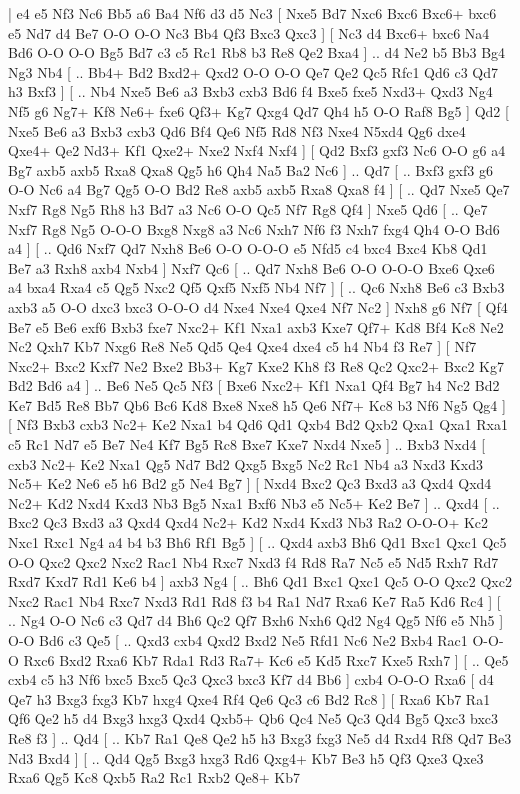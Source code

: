 \makegametitle 
|   e4   e5    Nf3   Nc6    Bb5   a6    Ba4   Nf6    d3   d5    Nc3 [  Nxe5 Bd7  Nxc6 Bxc6  Bxc6+ bxc6  e5 Nd7  d4 Be7  O-O O-O  Nc3 Bb4  Qf3 Bxc3  Qxc3   ]  [  Nc3 d4  Bxc6+ bxc6  Na4 Bd6  O-O O-O  Bg5 Bd7  c3 c5  Rc1 Rb8  b3 Re8  Qe2 Bxa4   ] .. d4    Ne2   b5    Bb3   Bg4    Ng3   Nb4 [ .. Bb4+  Bd2 Bxd2+  Qxd2 O-O  O-O Qe7  Qe2 Qc5  Rfc1 Qd6  c3 Qd7  h3 Bxf3   ]  [ .. Nb4  Nxe5 Be6  a3 Bxb3  cxb3 Bd6  f4 Bxe5  fxe5 Nxd3+  Qxd3 Ng4  Nf5 g6  Ng7+ Kf8  Ne6+ fxe6  Qf3+ Kg7  Qxg4 Qd7  Qh4 h5  O-O Raf8  Bg5   ]  Qd2 [  Nxe5 Be6  a3 Bxb3  cxb3 Qd6  Bf4 Qe6  Nf5 Rd8  Nf3 Nxe4  N5xd4 Qg6  dxe4 Qxe4+  Qe2 Nd3+  Kf1 Qxe2+  Nxe2 Nxf4  Nxf4   ]  [  Qd2 Bxf3  gxf3 Nc6  O-O g6  a4 Bg7  axb5 axb5  Rxa8 Qxa8  Qg5 h6  Qh4 Na5  Ba2 Nc6   ] .. Qd7 [ .. Bxf3  gxf3 g6  O-O Nc6  a4 Bg7  Qg5 O-O  Bd2 Re8  axb5 axb5  Rxa8 Qxa8  f4   ]  [ .. Qd7  Nxe5 Qe7  Nxf7 Rg8  Ng5 Rh8  h3 Bd7  a3 Nc6  O-O Qc5  Nf7 Rg8  Qf4   ]  Nxe5   Qd6 [ .. Qe7  Nxf7 Rg8  Ng5 O-O-O  Bxg8 Nxg8  a3 Nc6  Nxh7 Nf6  f3 Nxh7  fxg4 Qh4  O-O Bd6  a4   ]  [ .. Qd6  Nxf7 Qd7  Nxh8 Be6  O-O O-O-O  e5 Nfd5  c4 bxc4  Bxc4 Kb8  Qd1 Be7  a3 Rxh8  axb4 Nxb4   ]  Nxf7   Qc6 [ .. Qd7  Nxh8 Be6  O-O O-O-O  Bxe6 Qxe6  a4 bxa4  Rxa4 c5  Qg5 Nxc2  Qf5 Qxf5  Nxf5 Nb4  Nf7   ]  [ .. Qc6  Nxh8 Be6  c3 Bxb3  axb3 a5  O-O dxc3  bxc3 O-O-O  d4 Nxe4  Nxe4 Qxe4  Nf7 Nc2   ]  Nxh8   g6    Nf7 [  Qf4 Be7  e5 Be6  exf6 Bxb3  fxe7 Nxc2+  Kf1 Nxa1  axb3 Kxe7  Qf7+ Kd8  Bf4 Kc8  Ne2 Nc2  Qxh7 Kb7  Nxg6 Re8  Ne5 Qd5  Qe4 Qxe4  dxe4 c5  h4 Nb4  f3 Re7   ]  [  Nf7 Nxc2+  Bxc2 Kxf7  Ne2 Bxe2  Bb3+ Kg7  Kxe2 Kh8  f3 Re8  Qc2 Qxc2+  Bxc2 Kg7  Bd2 Bd6  a4   ] .. Be6    Ne5   Qc5    Nf3 [  Bxe6 Nxc2+  Kf1 Nxa1  Qf4 Bg7  h4 Nc2  Bd2 Ke7  Bd5 Re8  Bb7 Qb6  Bc6 Kd8  Bxe8 Nxe8  h5 Qe6  Nf7+ Kc8  b3 Nf6  Ng5 Qg4   ]  [  Nf3 Bxb3  cxb3 Nc2+  Ke2 Nxa1  b4 Qd6  Qd1 Qxb4  Bd2 Qxb2  Qxa1 Qxa1  Rxa1 c5  Rc1 Nd7  e5 Be7  Ne4 Kf7  Bg5 Rc8  Bxe7 Kxe7  Nxd4 Nxe5   ] .. Bxb3    Nxd4 [  cxb3 Nc2+  Ke2 Nxa1  Qg5 Nd7  Bd2 Qxg5  Bxg5 Nc2  Rc1 Nb4  a3 Nxd3  Kxd3 Nc5+  Ke2 Ne6  e5 h6  Bd2 g5  Ne4 Bg7   ]  [  Nxd4 Bxc2  Qc3 Bxd3  a3 Qxd4  Qxd4 Nc2+  Kd2 Nxd4  Kxd3 Nb3  Bg5 Nxa1  Bxf6 Nb3  e5 Nc5+  Ke2 Be7   ] .. Qxd4 [ .. Bxc2  Qc3 Bxd3  a3 Qxd4  Qxd4 Nc2+  Kd2 Nxd4  Kxd3 Nb3  Ra2 O-O-O+  Kc2 Nxc1  Rxc1 Ng4  a4 b4  b3 Bh6  Rf1 Bg5   ]  [ .. Qxd4  axb3 Bh6  Qd1 Bxc1  Qxc1 Qc5  O-O Qxc2  Qxc2 Nxc2  Rac1 Nb4  Rxc7 Nxd3  f4 Rd8  Ra7 Nc5  e5 Nd5  Rxh7 Rd7  Rxd7 Kxd7  Rd1 Ke6  b4   ]  axb3   Ng4 [ .. Bh6  Qd1 Bxc1  Qxc1 Qc5  O-O Qxc2  Qxc2 Nxc2  Rac1 Nb4  Rxc7 Nxd3  Rd1 Rd8  f3 b4  Ra1 Nd7  Rxa6 Ke7  Ra5 Kd6  Rc4   ]  [ .. Ng4  O-O Nc6  c3 Qd7  d4 Bh6  Qc2 Qf7  Bxh6 Nxh6  Qd2 Ng4  Qg5 Nf6  e5 Nh5   ]  O-O   Bd6    c3   Qe5 [ .. Qxd3  cxb4 Qxd2  Bxd2 Ne5  Rfd1 Nc6  Ne2 Bxb4  Rac1 O-O-O  Rxc6 Bxd2  Rxa6 Kb7  Rda1 Rd3  Ra7+ Kc6  e5 Kd5  Rxc7 Kxe5  Rxh7   ]  [ .. Qe5  cxb4 c5  h3 Nf6  bxc5 Bxc5  Qc3 Qxc3  bxc3 Kf7  d4 Bb6   ]  cxb4   O-O-O    Rxa6 [  d4 Qe7  h3 Bxg3  fxg3 Kb7  hxg4 Qxe4  Rf4 Qe6  Qc3 c6  Bd2 Rc8   ]  [  Rxa6 Kb7  Ra1 Qf6  Qe2 h5  d4 Bxg3  hxg3 Qxd4  Qxb5+ Qb6  Qc4 Ne5  Qc3 Qd4  Bg5 Qxc3  bxc3 Re8  f3   ] .. Qd4 [ .. Kb7  Ra1 Qe8  Qe2 h5  h3 Bxg3  fxg3 Ne5  d4 Rxd4  Rf8 Qd7  Be3 Nd3  Bxd4   ]  [ .. Qd4  Qg5 Bxg3  hxg3 Rd6  Qxg4+ Kb7  Be3 h5  Qf3 Qxe3  Qxe3 Rxa6  Qg5 Kc8  Qxb5 Ra2  Rc1 Rxb2  Qe8+ Kb7 